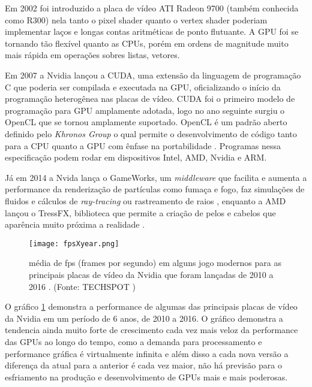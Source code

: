   Em 2002 foi introduzido a placa de vídeo ATI Radeon 9700 (também conhecida como R300)\citep{AMD} nela tanto o pixel shader quanto o vertex shader poderiam implementar laços e longas contas aritméticas de ponto flutuante. A GPU foi se tornando tão flexível quanto as CPUs, porém em ordens de magnitude muito mais rápida em operações sobres listas, vetores.

  Em 2007 a Nvidia lançou a CUDA, uma extensão da linguagem de programação C que poderia ser compilada e executada na GPU, oficializando o início da programação heterogênea nas placas de vídeo. CUDA foi o primeiro modelo de programação para GPU amplamente adotada, logo no ano seguinte surgiu o OpenCL que se tornou amplamente suportado. OpenCL é um padrão aberto definido pelo \textit{Khronos Group} o qual permite o desenvolvimento de código tanto para a CPU quanto a GPU com ênfase na portabilidade \citep{opencl}. Programas nessa especificação podem rodar em dispositivos Intel, AMD, Nvidia e ARM.


  Já em 2014 a Nvida lança o GameWorks, um \textit{middleware} que facilita e aumenta a performance da renderização de partículas como fumaça e fogo, faz simulações de fluidos e cálculos de \textit{ray-tracing} ou rastreamento de raios \citep{gameworks}, enquanto a AMD lançou o TressFX, biblioteca que permite a criação de pelos e cabelos que aparência muito próxima a realidade \citep{tressfx}.

  \begin{figure}[!h]
    \centering
    \texttt{[image: fpsXyear.png]}
    \caption{média de fps (frames por segundo) em alguns jogo modernos para as principais placas de vídeo da Nvidia que foram lançadas de 2010 a 2016 . (Fonte: TECHSPOT \protect\footnotemark)}
    \label{fig:fpsXyear}
  \end{figure}


  O gráfico \ref{fig:fpsXyear} demonstra a performance de algumas das principais placas de vídeo da Nvidia em um período de 6 anos, de 2010 a 2016. O gráfico demonstra a tendencia ainda muito forte de crescimento cada vez mais veloz da performance das GPUs ao longo do tempo, como a demanda para processamento e performance gráfica é virtualmente infinita e além disso a cada nova versão a diferença da atual para a anterior é cada vez maior, não há previsão para o esfriamento na produção e desenvolvimento de GPUs mais e mais poderosas.

